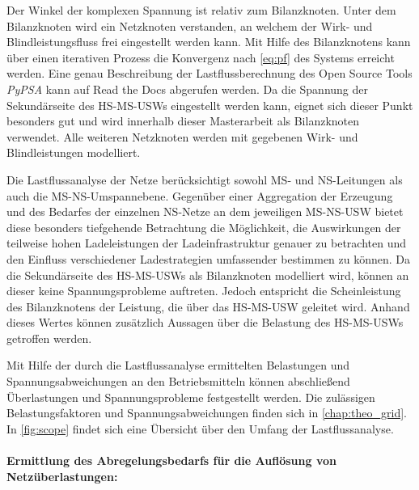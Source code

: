 
Der Winkel der komplexen Spannung ist relativ zum Bilanzknoten.
Unter dem Bilanzknoten wird ein Netzknoten verstanden, an welchem der Wirk- und Blindleistungsfluss frei eingestellt werden kann.
Mit Hilfe des Bilanzknotens kann über einen iterativen Prozess die Konvergenz nach \autoref{eq:pf} des Systems erreicht werden.
Eine genau Beschreibung der Lastflussberechnung des Open Source Tools \textit{PyPSA} kann auf Read the Docs \cite{Brown2020a} abgerufen werden.
Da die Spannung der Sekundärseite des \gls{HS}-\gls{MS}-\glspl{USW} eingestellt werden kann, eignet sich dieser Punkt besonders gut und wird innerhalb dieser Masterarbeit als Bilanzknoten verwendet.
Alle weiteren Netzknoten werden mit gegebenen Wirk- und Blindleistungen modelliert. \cite{Schachler}\medskip

Die Lastflussanalyse der Netze berücksichtigt sowohl \gls{MS}- und \gls{NS}-Leitungen als auch die \gls{MS}-\gls{NS}-Umspannebene.
Gegenüber einer Aggregation der Erzeugung und des Bedarfes der einzelnen \gls{NS}-Netze an dem jeweiligen \gls{MS}-\gls{NS}-\gls{USW} bietet diese besonders tiefgehende Betrachtung die Möglichkeit, die Auswirkungen der teilweise hohen Ladeleistungen der Ladeinfrastruktur genauer zu betrachten und den Einfluss verschiedener Ladestrategien umfassender bestimmen zu können.
Da die Sekundärseite des \gls{HS}-\gls{MS}-\glspl{USW} als Bilanzknoten modelliert wird, können an dieser keine Spannungsprobleme auftreten.
Jedoch entspricht die Scheinleistung des Bilanzknotens der Leistung, die über das \gls{HS}-\gls{MS}-\gls{USW} geleitet wird.
Anhand dieses Wertes können zusätzlich Aussagen über die Belastung des \gls{HS}-\gls{MS}-\glspl{USW} getroffen werden. \cite{Schachler}\medskip

Mit Hilfe der durch die Lastflussanalyse ermittelten Belastungen und Spannungsabweichungen an den Betriebsmitteln können abschließend Überlastungen und Spannungsprobleme festgestellt werden.
Die zulässigen Belastungsfaktoren und Spannungsabweichungen finden sich in \autoref{chap:theo_grid}.
In \autoref{fig:scope} findet sich eine Übersicht über den Umfang der Lastflussanalyse.




\paragraph{Ermittlung des Abregelungsbedarfs für die Auflösung von Netzüberlastungen:}

